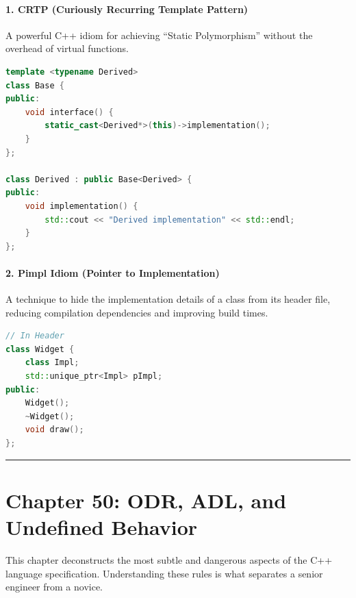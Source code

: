 \hypertarget{crtp-curiously-recurring-template-pattern}{%
\paragraph{1. CRTP (Curiously Recurring Template
Pattern)}\label{crtp-curiously-recurring-template-pattern}}

A powerful C++ idiom for achieving ``Static Polymorphism'' without the
overhead of virtual functions.

\begin{lstlisting}[language={C++}]
template <typename Derived>
class Base {
public:
    void interface() {
        static_cast<Derived*>(this)->implementation();
    }
};

class Derived : public Base<Derived> {
public:
    void implementation() {
        std::cout << "Derived implementation" << std::endl;
    }
};
\end{lstlisting}

\hypertarget{pimpl-idiom-pointer-to-implementation}{%
\paragraph{2. Pimpl Idiom (Pointer to
Implementation)}\label{pimpl-idiom-pointer-to-implementation}}

A technique to hide the implementation details of a class from its
header file, reducing compilation dependencies and improving build
times.

\begin{lstlisting}[language={C++}]
// In Header
class Widget {
    class Impl;
    std::unique_ptr<Impl> pImpl;
public:
    Widget();
    ~Widget();
    void draw();
};
\end{lstlisting}

\begin{center}\rule{0.5\linewidth}{0.5pt}\end{center}

\hypertarget{chapter-50-odr-adl-and-undefined-behavior}{%
\section{Chapter 50: ODR, ADL, and Undefined
Behavior}\label{chapter-50-odr-adl-and-undefined-behavior}}

This chapter deconstructs the most subtle and dangerous aspects of the
C++ language specification. Understanding these rules is what separates
a senior engineer from a novice.

